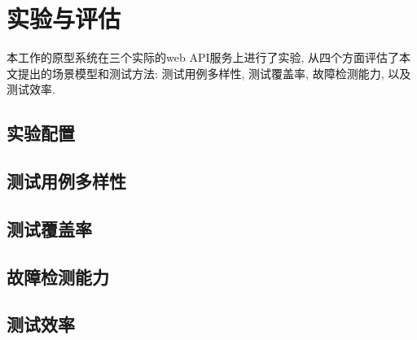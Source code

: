 \chapter{实验与评估}

    本工作的原型系统在三个实际的web API服务上进行了实验, 从四个方面评估了本文提出的场景模型和测试方法: 测试用例多样性, 测试覆盖率, 故障检测能力, 以及测试效率.
    
    \section{实验配置}
    
    
    \section{测试用例多样性}
    
    \section{测试覆盖率}
    
    \section{故障检测能力}
    
    \section{测试效率}

